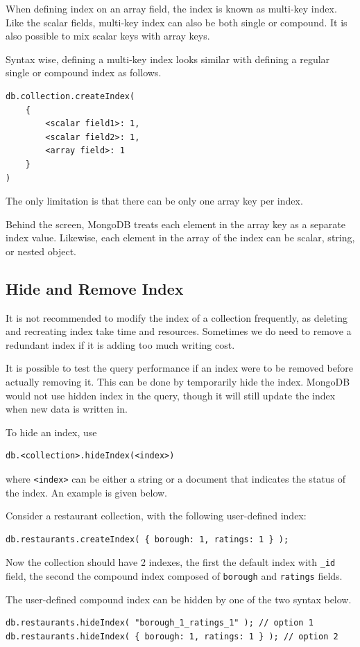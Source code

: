 When defining index on an array field, the index is known as multi-key index. Like the scalar fields, multi-key index can also be both single or compound. It is also possible to mix scalar keys with array keys.

Syntax wise, defining a multi-key index looks similar with defining a regular single or compound index as follows.
\begin{lstlisting}
db.collection.createIndex(
	{
		<scalar field1>: 1,
		<scalar field2>: 1,
		<array field>: 1
	}
)
\end{lstlisting}
The only limitation is that there can be only one array key per index.

Behind the screen, MongoDB treats each element in the array key as a separate index value. Likewise, each element in the array of the index can be scalar, string, or nested object.

\subsection{Hide and Remove Index}

It is not recommended to modify the index of a collection frequently, as deleting and recreating index take time and resources. Sometimes we do need to remove a redundant index if it is adding too much writing cost.

It is possible to test the query performance if an index were to be removed before actually removing it. This can be done by temporarily hide the index. MongoDB would not use hidden index in the query, though it will still update the index when new data is written in.

To hide an index, use
\begin{lstlisting}
db.<collection>.hideIndex(<index>)
\end{lstlisting}
where \verb|<index>| can be either a string or a document that indicates the status of the index. An example is given below.

Consider a restaurant collection, with the following user-defined index:
\begin{lstlisting}
db.restaurants.createIndex( { borough: 1, ratings: 1 } );
\end{lstlisting}
Now the collection should have 2 indexes, the first the default index with \verb|_id| field, the second the compound index composed of \verb|borough| and \verb|ratings| fields.

The user-defined compound index can be hidden by one of the two syntax below.
\begin{lstlisting}
db.restaurants.hideIndex( "borough_1_ratings_1" ); // option 1
db.restaurants.hideIndex( { borough: 1, ratings: 1 } ); // option 2
\end{lstlisting}

